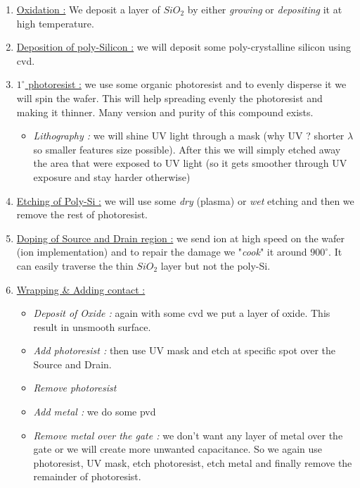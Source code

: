\documentclass{report}
\begin{document}
\begin{enumerate}
    \item \underline{Oxidation :} We deposit a layer of $SiO_2$ by either \textit{growing} or \textit{depositing} it at high temperature.
    \item \underline{Deposition of poly-Silicon :} we will deposit some poly-crystalline silicon using \gls{cvd}.
    \item \underline{$1^\circ$ photoresist :} we use some organic photoresist and to evenly disperse it we will spin the wafer. This will help spreading evenly the photoresist and making it thinner. Many version and purity of this compound exists.
    \begin{itemize}
        \item \textit{Lithography :} we will shine UV light through a mask (why UV ? shorter $\lambda$ so smaller features size possible). After this we will simply etched away the area that were exposed to UV light (so it gets smoother through UV exposure and stay harder otherwise)
    \end{itemize}
    \item \underline{Etching of Poly-Si :} we will use some \textit{dry} (plasma) or \textit{wet} etching and then we remove the rest of photoresist.
    \item \underline{Doping of Source and Drain region :} we send ion at high speed on the wafer (ion implementation) and to repair the damage we "\textit{cook}" it around $900^\circ$. It can easily traverse the thin $SiO_2$ layer but not the poly-Si.
    \item \underline{Wrapping \& Adding contact :}
    \begin{itemize}
        \item \textit{Deposit of Oxide :} again with some \gls{cvd} we put a layer of oxide. This result in unsmooth surface.
        \item \textit{Add photoresist :} then use UV mask and etch at specific spot over the Source and Drain.
        \item \textit{Remove photoresist}
        \item \textit{Add metal :} we do some \gls{pvd}
        \item \textit{Remove metal over the gate :} we don't want any layer of metal over the gate or we will create more unwanted capacitance. So we again use photoresist, UV mask, etch photoresist, etch metal and finally remove the remainder of photoresist.
    \end{itemize}
\end{enumerate}
\end{document}
